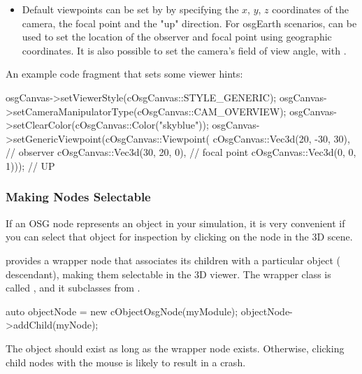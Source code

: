 \begin{itemize}
\item {}
    Default viewpoints can be set by 
    by specifying the $x$, $y$, $z$ coordinates of the camera, the focal
    point and the "up" direction. For osgEarth scenarios,
     can be used to set the
    location of the observer and focal point using geographic coordinates. It
    is also possible to set the camera's field of view angle, with
    .

\end{itemize}

An example code fragment that sets some viewer hints:

\begin{cpp}
osgCanvas->setViewerStyle(cOsgCanvas::STYLE_GENERIC);
osgCanvas->setCameraManipulatorType(cOsgCanvas::CAM_OVERVIEW);
osgCanvas->setClearColor(cOsgCanvas::Color("skyblue"));
osgCanvas->setGenericViewpoint(cOsgCanvas::Viewpoint(
        cOsgCanvas::Vec3d(20, -30, 30), // observer
        cOsgCanvas::Vec3d(30, 20, 0),   // focal point
        cOsgCanvas::Vec3d(0, 0, 1)));   // UP
\end{cpp}


\subsubsection{Making Nodes Selectable}
\label{sec:graphics:making-osg-nodes-selectable}

If an OSG node represents an object in your simulation, it is very convenient
if you can select that object for inspection by clicking on the node in the 3D scene.

{\opp} provides a wrapper node that associates its children with a particular {\opp}
object ( descendant), making them selectable in the 3D viewer.
The wrapper class is called , and it subclasses
from .

\begin{cpp}
auto objectNode = new cObjectOsgNode(myModule);
objectNode->addChild(myNode);
\end{cpp}

\begin{note}
The {\opp} object should exist as long as the wrapper node exists. Otherwise,
clicking child nodes with the mouse is likely to result in a crash.
\end{note}

